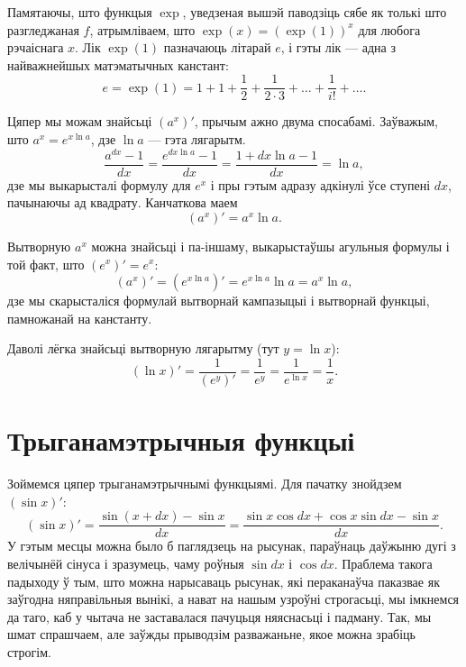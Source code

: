 \documentclass[10pt,a4paper]{book}
\theoremstyle{plain}
\begin{document}
Памятаючы, што функцыя $\exp$, уведзеная вышэй паводзіць сябе як толькі што
разгледжаная $f$, атрымліваем, што $\exp(x) = (\exp(1))^x$ для любога рэчаіснага
$x$. Лік $\exp(1)$ пазначаюць літарай $e$, і гэты лік --- адна з найважнейшых
матэматычных канстант:
\begin{equation*}
  e = \exp(1) = 1 + 1 + \frac{1}{2} + \frac{1}{2 \cdot 3} + \dots + \frac{1}{i!} + \dots.
\end{equation*}

Цяпер мы можам знайсьці $(a^x)'$, прычым ажно двума спосабамі. Заўважым, што
$a^{x} = e^{x\ln a}$, дзе $\ln a$ --- гэта лягарытм.
\begin{equation*}
  \frac{a^{dx} - 1}{dx} = \frac{e^{dx \ln a} - 1}{dx} = \frac{1 + dx \ln a -
    1}{dx} = \ln a,
\end{equation*}
дзе мы выкарысталі формулу для $e^{x}$ і пры гэтым адразу адкінулі ўсе ступені
$dx$, пачынаючы ад квадрату. Канчаткова маем
\begin{equation*}
  (a^{x})' = a^{x} \ln a.
\end{equation*}

Вытворную $a^{x}$ можна знайсьці і па-іншаму, выкарыстаўшы агульныя формулы і
той факт, што $(e^x)' = e^x$:
\begin{equation*}
  (a^{x})' = (e^{x \ln a})' = e^{x \ln a} \ln a = a^{x} \ln a,
\end{equation*}
дзе мы скарысталіся формулай вытворнай кампазыцыі і вытворнай функцыі,
памножанай на канстанту.

Даволі лёгка знайсьці вытворную лягарытму (тут $y = \ln x$):
\begin{equation*}
  (\ln x)' = \frac{1}{(e^y)'} = \frac{1}{e^y} = \frac{1}{e^{\ln x}} =
  \frac{1}{x}.
\end{equation*}

\section{Трыганамэтрычныя функцыі}

Зоймемся цяпер трыганамэтрычнымі функцыямі. Для пачатку знойдзем $(\sin x)'$:
\begin{equation*}
  (\sin x)' = \frac{\sin(x + dx) - \sin x}{dx} = \frac{\sin x \cos dx + \cos x
    \sin dx - \sin x}{dx}.
\end{equation*}
У гэтым месцы можна было б паглядзець на рысунак, параўнаць даўжыню дугі з
велічынёй сінуса і зразумець, чаму роўныя $\sin dx$ і $\cos dx$. Праблема такога
падыходу ў тым, што можна нарысаваць рысунак, які пераканаўча паказвае як
заўгодна няправільныя вынікі, а нават на нашым узроўні строгасьці, мы імкнемся
да таго, каб у чытача не заставалася пачуцьця няяснасьці і падману. Так, мы шмат
спрашчаем, але заўжды прыводзім разважаньне, якое можна зрабіць строгім.
\end{document}
